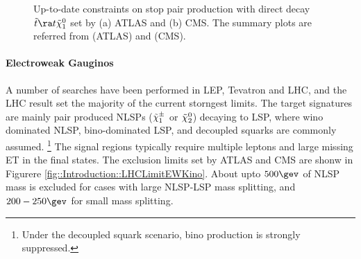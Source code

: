 \begin{figure}[h]
  \centering
    \caption{Up-to-date constraints on stop pair production with direct decay $\ttop \ra t \tilde{\chi}_1^0$ set by (a) ATLAS and (b) CMS.
      The summary plots are referred from \cite{ATLAS_SUSY_PublicResult} (ATLAS) and \cite{CMS_SUSY_PubResult} (CMS).
    }
    \label{fig::Introduction::LHCLimitStop}
\end{figure}



\paragraph{Electroweak Gauginos}
A number of searches have been performed in LEP, Tevatron and LHC, and the LHC result set the majority of the current storngest limits. The target signatures are mainly pair produced NLSPs ($\tilde{\chi}_{1}^{\pm}$ or $\tilde{\chi}_{2}^{0}$) decaying to LSP, where wino dominated NLSP, bino-dominated LSP, and decoupled squarks are commonly assumed.
\footnote{Under the decoupled squark scenario, bino production is strongly suppressed.}
The signal regions typically require multiple leptons and large missing ET in the final states.
The exclusion limits set by ATLAS and CMS are shonw in Figurere \ref{fig::Introduction::LHCLimitEWKino}.
About upto $500\gev$ of NLSP mass is excluded for cases with large NLSP-LSP mass splitting, and $200-250\gev$ for small mass splitting.  \\


